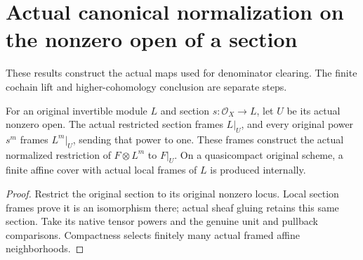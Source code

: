 \section{Actual canonical normalization on the nonzero open of a section}

These results construct the actual maps used for denominator clearing. The finite cochain lift and higher-cohomology conclusion are separate steps.

\begin{lemma}
\label{lem:cech-line-section-original-canonical-open}
\leanok
For an original invertible module $L$ and section $s:\mathcal O_X\to L$, let $U$ be its actual nonzero open. The actual restricted section frames $L|_U$, and every original power $s^m$ frames $L^m|_U$, sending that power to one. These frames construct the actual normalized restriction of $F\otimes L^m$ to $F|_U$. On a quasicompact original scheme, a finite affine cover with actual local frames of $L$ is produced internally.
\end{lemma}
\begin{proof}
Restrict the original section to its original nonzero locus. Local section frames prove it is an isomorphism there; actual sheaf gluing retains this same section. Take its native tensor powers and the genuine unit and pullback comparisons. Compactness selects finitely many actual framed affine neighborhoods.
\end{proof}

